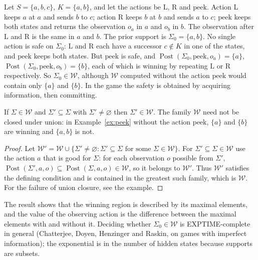 \begin{example}[Peeking]\label{ex:peek}
Let $S=\{a,b,c\}$, $K=\{a,b\}$, and let the actions be $\mathrm{L}$, $\mathrm{R}$ and $\mathrm{peek}$. Action $\mathrm{L}$ keeps $a$ at $a$ and sends $b$ to $c$; action $\mathrm{R}$ keeps $b$ at $b$ and sends $a$ to $c$; $\mathrm{peek}$ keeps both states and returns the observation $o_a$ in $a$ and $o_b$ in $b$. The observation after $\mathrm{L}$ and $\mathrm{R}$ is the same in $a$ and $b$. The prior support is $\Sigma_0=\{a,b\}$. No single action is safe on $\Sigma_0$: $\mathrm{L}$ and $\mathrm{R}$ each have a successor $c\notin K$ in one of the states, and $\mathrm{peek}$ keeps both states. But $\mathrm{peek}$ is safe, and $\operatorname{Post}(\Sigma_0,\mathrm{peek},o_a)=\{a\}$, $\operatorname{Post}(\Sigma_0,\mathrm{peek},o_b)=\{b\}$, each of which is winning by repeating $\mathrm{L}$ or $\mathrm{R}$ respectively. So $\Sigma_0\in\mathcal W$, although $\mathcal W$ computed without the action $\mathrm{peek}$ would contain only $\{a\}$ and $\{b\}$. In the game the safety is obtained by acquiring information, then committing.
\end{example}

\begin{newresult}\label{prop:down-closed}
If $\Sigma\in\mathcal W$ and $\Sigma'\subseteq\Sigma$ with $\Sigma'\ne\varnothing$ then $\Sigma'\in\mathcal W$. The family $\mathcal W$ need not be closed under union: in Example~\ref{ex:peek} without the action $\mathrm{peek}$, $\{a\}$ and $\{b\}$ are winning and $\{a,b\}$ is not.
\end{newresult}
\begin{proof}
Let $\mathcal W'=\mathcal W\cup\{\Sigma'\ne\varnothing:\Sigma'\subseteq\Sigma\text{ for some }\Sigma\in\mathcal W\}$. For $\Sigma'\subseteq\Sigma\in\mathcal W$ use the action $a$ that is good for $\Sigma$: for each observation $o$ possible from $\Sigma'$, $\operatorname{Post}(\Sigma',a,o)\subseteq\operatorname{Post}(\Sigma,a,o)\in\mathcal W$, so it belongs to $\mathcal W'$. Thus $\mathcal W'$ satisfies the defining condition and is contained in the greatest such family, which is $\mathcal W$. For the failure of union closure, see the example.
\end{proof}

The result shows that the winning region is described by its maximal elements, and the value of the observing action is the difference between the maximal elements with and without it. Deciding whether $\Sigma_0\in\mathcal W$ is EXPTIME-complete in general (Chatterjee, Doyen, Henzinger and Raskin, on games with imperfect information); the exponential is in the number of hidden states because supports are subsets.



